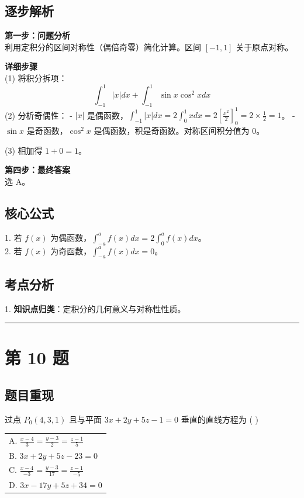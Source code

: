 \documentclass[10pt, a4paper]{ctexart}
\newcommand{\problemheader}{
    \vspace{0.5cm}
    \noindent\rule[0.5ex]{\linewidth}{2pt} %
}
\newcommand{\analysisheader}{
    \vspace{0.2cm}
    \noindent{\color{red}\rule[0.5ex]{\linewidth}{0.5pt}} %
    \vspace{0.1cm}
}
\begin{document}
\analysisheader
{\color{red}
\subsection*{逐步解析}
\textbf{第一步：问题分析} \\
利用定积分的区间对称性（偶倍奇零）简化计算。区间 $[-1, 1]$ 关于原点对称。

\textbf{详细步骤} \\
(1) 将积分拆项：
\[ \int_{-1}^{1} |x| dx + \int_{-1}^{1} \sin x \cos^2 x dx \]
(2) 分析奇偶性：
- $|x|$ 是偶函数，$\int_{-1}^{1} |x| dx = 2 \int_{0}^{1} x dx = 2 \left[ \frac{x^2}{2} \right]_0^1 = 2 \times \frac{1}{2} = 1$。
- $\sin x$ 是奇函数，$\cos^2 x$ 是偶函数，积是奇函数。对称区间积分值为 0。

(3) 相加得 $1 + 0 = 1$。

\textbf{第四步：最终答案} \\
选 A。

\subsection*{核心公式}
1. 若 $f(x)$ 为偶函数，$\int_{-a}^{a} f(x) dx = 2\int_0^a f(x) dx$。 \\
2. 若 $f(x)$ 为奇函数，$\int_{-a}^{a} f(x) dx = 0$。

\subsection*{考点分析}
1. \textbf{知识点归类}：定积分的几何意义与对称性性质。
}

\problemheader
\section*{第 10 题}
\subsection*{题目重现}
过点 $P_0(4,3,1)$ 且与平面 $3x+2y+5z-1=0$ 垂直的直线方程为 ( \quad ) \\
\begin{tabularx}{\linewidth}{@{} X @{}}
    A. $\frac{x-4}{3} = \frac{y-3}{2} = \frac{z-1}{5}$ \\
    B. $3x+2y+5z-23=0$ \\
    C. $\frac{x-4}{-3} = \frac{y-3}{17} = \frac{z-1}{-5}$ \\
    D. $3x-17y+5z+34=0$
\end{tabularx}
\end{document}

